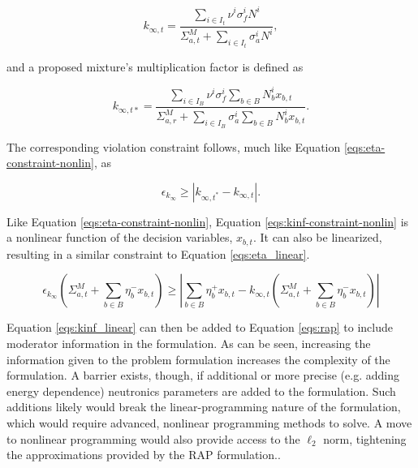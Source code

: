 \begin{equation}
\label{eqs:kinf_t}
k_{\infty, t} = \frac{\sum_{i \in I_t} \nu^i \sigma_f^i N^i}
                      {\Sigma^M_{a, t} + \sum_{i \in I_t} \sigma_a^i N^i},
\end{equation}

and a proposed mixture's multiplication factor is defined as 

\begin{equation}
\label{eqs:kinf_t*}
k_{\infty, t*} = \frac{\sum_{i \in I_{B}} \nu^{i} \sigma_{f}^{i} \sum_{b \in B} N_{b}^{i} x_{b,t}}
                {\Sigma^M_{a,r} + \sum_{i \in I_{B}} \sigma_{a}^{i} \sum_{b \in B} N_{b}^{i} x_{b,t}}.
\end{equation}

The corresponding violation constraint follows, much like Equation
\ref{eqs:eta-constraint-nonlin}, as

\begin{equation}\label{eqs:kinf-constraint-nonlin}
\epsilon_{k_\infty} \geq \left| k_{\infty, t^*} - k_{\infty, t} \right|.
\end{equation}

Like Equation \ref{eqs:eta-constraint-nonlin}, Equation
\ref{eqs:kinf-constraint-nonlin} is a nonlinear function of the decision
variables, $x_{b, t}$. It can also be linearized, resulting in a similar
constraint to Equation \ref{eqs:eta_linear}.

\begin{equation}
\label{eqs:kinf_linear}
\epsilon_{k_{\infty}} \left( \Sigma_{a,t}^{M} + \sum_{b \in B} \eta_{b}^{-} x_{b,t} \right)
\geq
\left| \sum_{b \in B} \eta_{b}^{+} x_{b,t}
- k_{\infty,t}  \left( \Sigma_{a,t}^{M} + \sum_{b \in B} \eta_{b}^{-} x_{b,t} \right) \right|
\end{equation}

Equation \ref{eqs:kinf_linear} can then be added to Equation \ref{eqs:rap} to
include moderator information in the formulation. As can be seen, increasing the
information given to the problem formulation increases the complexity of the
formulation. A barrier exists, though, if additional or more precise
(e.g. adding energy dependence) neutronics parameters are added to the
formulation. Such additions likely would break the linear-programming nature of
the formulation, which would require advanced, nonlinear programming methods to
solve. A move to nonlinear programming would also provide access to the $\ell_2$
norm, tightening the approximations provided by the RAP formulation..
